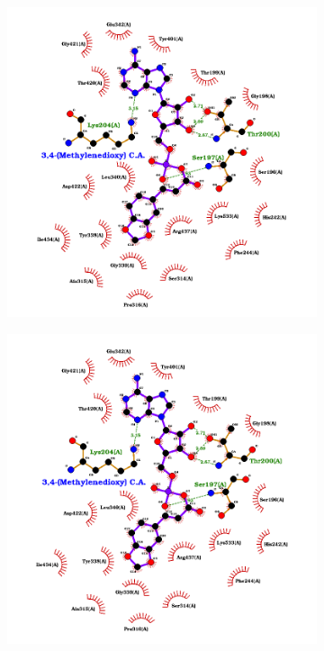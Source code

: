 \documentclass[12pt]{article}
\begin{document}
\begin{figure}[h!]
\begin{subfigure}[h!]{0.35\textwidth}
			\caption{}
		\end{subfigure}
		\hfill
		\begin{subfigure}[h!]{0.35\textwidth}
			\hspace{2cm}
			\includegraphics[width=\textwidth]{../6/propose/Dock/best3.png}
			\caption{}
		\end{subfigure}
		\hfill
		\begin{subfigure}[h!]{0.35\textwidth}
			\hspace{-2cm}
			\includegraphics[width=\textwidth]{../6/propose/Dock/best4.png}

\end{subfigure}
\end{figure}
\end{document}
